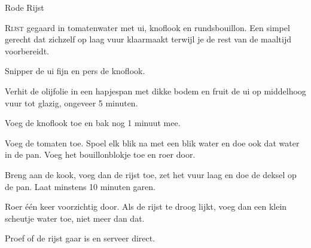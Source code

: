 \begin{recipe}{Rode Rijst}


\lettrine{R}{ijst} gegaard in tomatenwater met ui, knoflook en rundsbouillon.
Een simpel gerecht dat zichzelf op laag vuur klaarmaakt terwijl je de rest
van de maaltijd voorbereidt.

\begin{ingredients}
\end{ingredients}

\begin{steps}
  \item Snipper de ui fijn en pers de knoflook.
  \item Verhit de olijfolie in een hapjespan met dikke bodem en fruit de ui op
        middelhoog vuur tot glazig, ongeveer 5 minuten.
  \item Voeg de knoflook toe en bak nog 1 minuut mee.
  \item Voeg de tomaten toe. Spoel elk blik na met een blik water en doe
        ook dat water in de pan. Voeg het bouillonblokje toe en roer door.
  \item Breng aan de kook, voeg dan de rijst toe, zet het vuur laag en doe
        de deksel op de pan. Laat minstens 10 minuten garen.
  \item Roer één keer voorzichtig door. Als de rijst te droog lijkt, voeg
        dan een klein scheutje water toe, niet meer dan dat.
  \item Proef of de rijst gaar is en serveer direct.
\end{steps}
\end{recipe}
